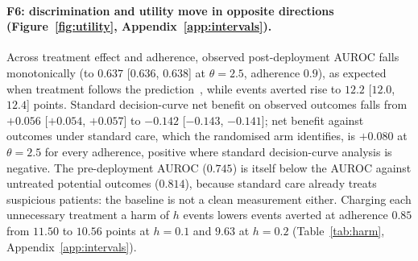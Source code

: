 \documentclass[letterpaper]{article} %
\begin{document}
\paragraph{F6: discrimination and utility move in opposite directions
(Figure~\ref{fig:utility}, Appendix~\ref{app:intervals}).} Across treatment
effect and adherence, observed post-deployment AUROC falls monotonically (to
$0.637$ [$0.636$, $0.638$] at $\theta = 2.5$, adherence $0.9$), as expected
when treatment follows the prediction~\citep{pajouheshnia2017accounting},
while events averted rise to $12.2$ [$12.0$, $12.4$] points. Standard
decision-curve net benefit on observed outcomes falls from $+0.056$ [$+0.054$,
$+0.057$] to $-0.142$ [$-0.143$, $-0.141$]; net benefit against outcomes under standard care, which the
randomised arm identifies, is $+0.080$ at $\theta = 2.5$ for every adherence,
positive where standard decision-curve analysis is negative. The
pre-deployment AUROC ($0.745$) is itself below the AUROC against untreated
potential outcomes ($0.814$), because standard care already treats suspicious
patients: the baseline is not a clean measurement either. Charging each
unnecessary treatment a harm of $h$ events lowers events averted at adherence
$0.85$ from $11.50$ to $10.56$ points at $h = 0.1$ and $9.63$ at $h = 0.2$
(Table~\ref{tab:harm}, Appendix~\ref{app:intervals}).
\end{document}
